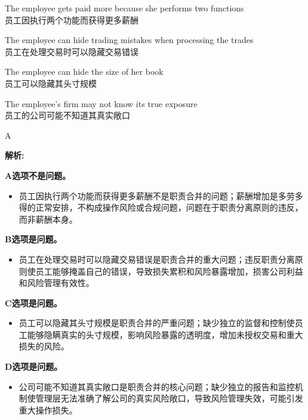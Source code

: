 \documentclass{article}
\newenvironment{explanation}
{\textbf{解析:}\par}
{\par}
\begin{document}
\begin{choices}
    \item The employee gets paid more because she performs two functions\\
    员工因执行两个功能而获得更多薪酬
    \item The employee can hide trading mistakes when processing the trades\\
    员工在处理交易时可以隐藏交易错误
    \item The employee can hide the size of her book\\
    员工可以隐藏其头寸规模
    \item The employee’s firm may not know its true exposure\\
    员工的公司可能不知道其真实敞口
\end{choices}

\begin{correctanswer}
    A
\end{correctanswer}

\begin{explanation}
    \textbf{A选项不是问题。}
    \begin{itemize}
        \item 员工因执行两个功能而获得更多薪酬不是职责合并的问题；薪酬增加是多劳多得的正常安排，不构成操作风险或合规问题，问题在于职责分离原则的违反，而非薪酬本身。
    \end{itemize}

    \textbf{B选项是问题。}
    \begin{itemize}
        \item 员工在处理交易时可以隐藏交易错误是职责合并的重大问题；违反职责分离原则使员工能够掩盖自己的错误，导致损失累积和风险暴露增加，损害公司利益和风险管理有效性。
    \end{itemize}

    \textbf{C选项是问题。}
    \begin{itemize}
        \item 员工可以隐藏其头寸规模是职责合并的严重问题；缺少独立的监督和控制使员工能够隐瞒真实的头寸规模，影响风险暴露的透明度，增加未授权交易和重大损失的风险。
    \end{itemize}

    \textbf{D选项是问题。}
    \begin{itemize}
        \item 公司可能不知道其真实敞口是职责合并的核心问题；缺少独立的报告和监控机制使管理层无法准确了解公司的真实风险敞口，导致风险管理失效，可能引发重大操作损失。
    \end{itemize}
\end{explanation}
\end{document}
